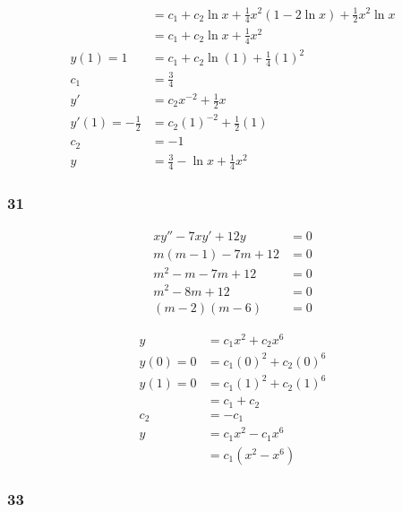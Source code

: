 \documentclass{article}
\begin{document}
\begin{align*}
                       & = c_1 + c_2 \ln x + \frac{1}{4} x^2 (1 - 2 \ln x) + \frac{1}{2} x^2 \ln x \\
                       & = c_1 + c_2 \ln x + \frac{1}{4} x^2                                       \\
  y(1) = 1             & = c_1 + c_2 \ln (1) + \frac{1}{4} (1)^2                                   \\
  c_1                  & = \frac{3}{4}                                                             \\
  y'                   & = c_2 x^{-2} + \frac{1}{2} x                                              \\
  y'(1) = -\frac{1}{2} & = c_2 (1)^{-2} + \frac{1}{2} (1)                                          \\
  c_2                  & = -1                                                                      \\
  y                    & = \frac{3}{4} - \ln x + \frac{1}{4} x^2
\end{align*}

\subsubsection{31}

\begin{align*}
  x y'' - 7 x y' + 12 y & = 0 \\
  m (m - 1) - 7m + 12   & = 0 \\
  m^2 - m - 7m + 12     & = 0 \\
  m^2 - 8m + 12         & = 0 \\
  (m - 2) (m - 6)       & = 0
\end{align*}

\begin{align*}
  y        & = c_1 x^2 + c_2 x^6     \\
  y(0) = 0 & = c_1 (0)^2 + c_2 (0)^6 \\
  y(1) = 0 & = c_1 (1)^2 + c_2 (1)^6 \\
           & = c_1 + c_2             \\
  c_2      & = -c_1                  \\
  y        & = c_1 x^2 - c_1 x^6     \\
           & = c_1 (x^2 - x^6)
\end{align*}

\subsubsection{33}
\end{document}
